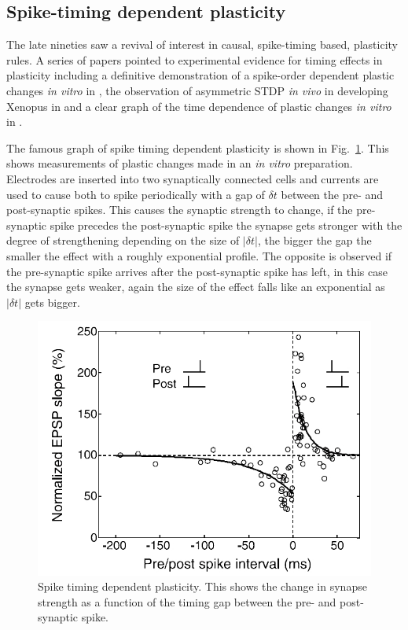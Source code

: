 \documentclass[11pt,a4paper]{scrartcl}
\begin{document}
\subsection*{Spike-timing dependent plasticity}

The late nineties saw a revival of interest in causal, spike-timing
based, plasticity rules. A series of papers pointed to experimental evidence for
timing effects in plasticity
\cite{MarkramSakmann1995a,MarkramEtAl1997a,BellEtAl1997a,MageeJohnston1997a,DebanneGahwilerThompson1998a}
including a definitive demonstration of a spike-order dependent
plastic changes \textsl{in vitro} in \cite{MarkramEtAl1997a}, the
observation of asymmetric STDP \textsl{in vivo} in developing Xenopus
in \cite{ZhangTaoHoltHarrisPoo1998a} and a clear graph of the time
dependence of plastic changes \textsl{in vitro} in
\cite{BiPoo1998a}.

The famous graph of spike timing dependent plasticity is shown in
Fig.~\ref{fig:BiPoo}. This shows measurements of plastic changes made
in an \textsl{in vitro} preparation. Electrodes are inserted into two
synaptically connected cells and currents are used to cause both to
spike periodically with a gap of $\delta t$ between the pre- and
post-synaptic spikes. This causes the synaptic strength to change, if
the pre-synaptic spike precedes the post-synaptic spike the synapse
gets stronger with the degree of strengthening depending on the size
of $|\delta t|$, the bigger the gap the smaller the effect with a
roughly exponential profile. The opposite is observed if the
pre-synaptic spike arrives after the post-synaptic spike has left, in
this case the synapse gets weaker, again the size of the effect falls
like an exponential as $|\delta t|$ gets bigger. 


\begin{figure}
\begin{center}
\includegraphics[width=12cm]{DanPoo2004.jpg}
\end{center}
\caption{Spike timing dependent plasticity. This shows the change in
  synapse strength as a function of the timing gap between the pre-
  and post-synaptic spike. \label{fig:BiPoo}}
\end{figure}
\end{document}
